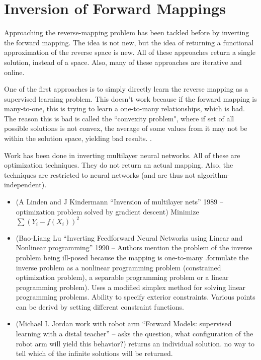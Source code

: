 \section{Inversion of Forward Mappings}
\label{sec:invfm}
Approaching the reverse-mapping problem has been tackled before by inverting the forward mapping.
The idea is not new, but the idea of returning a functional approximation of the reverse space is new.
All of these approaches return a single solution, instead of a space.
Also, many of these approaches are iterative and online.

One of the first approaches is to simply directly learn the reverse mapping as a supervised learning problem\cite{widrow1985adaptive}.
This doesn't work because if the forward mapping is many-to-one, this is trying to learn a one-to-many relationships, which is bad.
The reason this is bad is called the ``convexity problem", where if set of all possible solutions is not convex, the average of some values from it may not be within the solution space, yielding bad results. \cite{jordan-forward}.

Work has been done in inverting multilayer neural networks.
All of these are optimization techniques.
They do not return an actual mapping.
Also, the techniques are restricted to neural networks (and are thus not algorithm-independent).

\begin{itemize}
\item (A Linden and J Kindermann ``Inversion of multilayer nets'' 1989 -- optimization problem solved by gradient descent) Minimize $\sum (Y_i - f(X_i))^2$ \cite{linden1989inversion}
\item (Bao-Liang Lu ``Inverting Feedforward Neural Networks using Linear and Nonlinear programming'' 1990 --  Authors mention the problem of the inverse problem being ill-posed because the mapping is one-to-many .formulate the inverse problem as a nonlinear programming problem (constrained optimization problem), a separable programming problem or a linear programming problem). Uses a modified simplex method for solving linear programming problems.
Ability to specify exterior constraints.
Various points can be derivd by setting different constraint functions. \cite{lu1999inverting}
\item (Michael I. Jordan work with robot arm ``Forward Models: supervised learning with a distal teacher'' -- asks the question, what configuration of the robot arm will yield this behavior?)
returns an individual solution.
no way to tell which of the infinite solutions will be returned.
\end{itemize}

